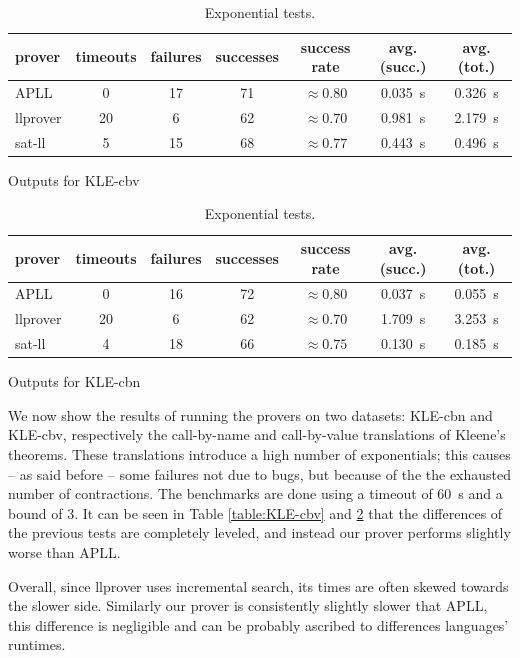 \begin{table}[h!]
	\begin{subtable}{\textwidth}
		\centering
		{\footnotesize
		\begin{tabular}{ | l c c c c c c | }
			\hline
			\textbf{prover} & \textbf{timeouts} & \textbf{failures} & \textbf{successes} & \textbf{success rate} & \textbf{avg. (succ.)} & \textbf{avg. (tot.)} \\
			\hline
			\hline
			APLL & 0 & 17 & 71 & $\approx 0.80$ & \qty{0.035}{\second} & \qty{0.326}{\second} \\
			llprover & 20 & 6 & 62 & $\approx 0.70$ & \qty{0.981}{\second} & \qty{2.179}{\second} \\
			sat-ll & 5 & 15 & 68 & $\approx 0.77$ & \qty{0.443}{\second} & \qty{0.496}{\second} \\
			\hline
		\end{tabular}
		}
		\caption{Outputs for KLE-cbv}
		\label{table:KLE-cbv}
	\end{subtable}\vspace{.5cm}
	\begin{subtable}{\textwidth}
		\centering
		{\footnotesize
		\begin{tabular}{ | l c c c c c c | }
			\hline
			\textbf{prover} & \textbf{timeouts} & \textbf{failures} & \textbf{successes} & \textbf{success rate} & \textbf{avg. (succ.)} & \textbf{avg. (tot.)} \\
			\hline
			\hline
			APLL & 0 & 16 & 72 & $\approx 0.80$ & \qty{0.037}{\second} & \qty{0.055}{\second} \\
			llprover & 20 & 6 & 62 & $\approx 0.70$ & \qty{1.709}{\second} & \qty{3.253}{\second} \\
			sat-ll & 4 & 18 & 66 & $\approx 0.75$ & \qty{0.130}{\second} & \qty{0.185}{\second} \\
			\hline
		\end{tabular}
		}
		\caption{Outputs for KLE-cbn}
		\label{table:KLE-cbn}
	\end{subtable}
	\caption{Exponential tests.}
\end{table}
We now show the results of running the provers on two datasets: KLE-cbn and KLE-cbv, respectively the call-by-name and call-by-value translations of Kleene's theorems.
These translations introduce a high number of exponentials; this causes -- as said before -- some failures not due to bugs, but because of the the exhausted number of contractions.
The benchmarks are done using a timeout of \qty{60}{\second} and a bound of 3.
It can be seen in Table \ref{table:KLE-cbv} and \ref{table:KLE-cbn} that the differences of the previous tests are completely leveled, and instead our prover performs slightly worse than APLL.

Overall, since llprover uses incremental search, its times are often skewed towards the slower side.
Similarly our prover is consistently slightly slower that APLL, this difference is negligible and can be probably ascribed to differences languages' runtimes.

